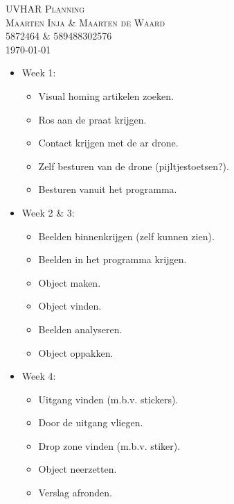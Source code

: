 \documentclass[10pt, titlepage, oneside, a4paper]{article}
\begin{document}
\begin{center}
\textsc{\LARGE UVHAR Planning}\\[10pt]
\textsc{\Large Maarten Inja \& Maarten de Waard}\\[10pt]
\textsc{\large 5872464 \& 589488302576}\\
{\large \today}
\end{center}


\begin{itemize}     
\item Week 1:
\begin{itemize}     
\item Visual homing artikelen zoeken.
\item Ros aan de praat krijgen.
\item Contact krijgen met de ar drone.
\item Zelf besturen van de drone (pijltjestoetsen?).
\item Besturen vanuit het programma.
\end{itemize}
\item Week 2 \& 3: 
\begin{itemize}
\item Beelden binnenkrijgen (zelf kunnen zien).
\item Beelden in het programma krijgen.
\item Object maken.
\item Object vinden.
\item Beelden analyseren.
\item Object oppakken.
\end{itemize}
\item Week 4: 
\begin{itemize}
\item Uitgang vinden (m.b.v. stickers).
\item Door de uitgang vliegen.
\item Drop zone vinden (m.b.v. stiker).
\item Object neerzetten.
\item Verslag afronden.
\end{itemize}
\end{itemize}
\end{document}
